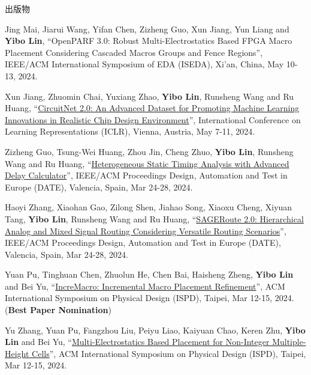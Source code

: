 \begin{rSection}{出版物}
\begin{description}[font=\normalfont, rightmargin=2em]
{}
            

\item[{[C94]}]{
        Jing Mai, Jiarui Wang, Yifan Chen, Zizheng Guo, Xun Jiang, Yun Liang and \textbf{Yibo Lin}, 
    ``OpenPARF 3.0: Robust Multi-Electrostatics Based FPGA Macro Placement Considering Cascaded Macros Groups and Fence Regions'', 
    IEEE/ACM International Symposium of EDA (ISEDA), Xi'an, China, May 10-13, 2024.
    
}
            

\item[{[C93]}]{
        Xun Jiang, Zhuomin Chai, Yuxiang Zhao, \textbf{Yibo Lin}, Runsheng Wang and Ru Huang, 
    ``\href{https://openreview.net/pdf?id=nMFSUjxMIl}{CircuitNet 2.0: An Advanced Dataset for Promoting Machine Learning Innovations in Realistic Chip Design Environment}'', 
    International Conference on Learning Representations (ICLR), Vienna, Austria, May 7-11, 2024.
    
}
            

\item[{[C92]}]{
        Zizheng Guo, Tsung-Wei Huang, Zhou Jin, Cheng Zhuo, \textbf{Yibo Lin}, Runsheng Wang and Ru Huang, 
    ``\href{https://ieeexplore.ieee.org/document/10546507}{Heterogeneous Static Timing Analysis with Advanced Delay Calculator}'', 
    IEEE/ACM Proceedings Design, Automation and Test in Europe (DATE), Valencia, Spain, Mar 24-28, 2024.
    
}
            

\item[{[C91]}]{
        Haoyi Zhang, Xiaohan Gao, Zilong Shen, Jiahao Song, Xiaoxu Cheng, Xiyuan Tang, \textbf{Yibo Lin}, Runsheng Wang and Ru Huang, 
    ``\href{https://ieeexplore.ieee.org/document/10546542}{SAGERoute 2.0: Hierarchical Analog and Mixed Signal Routing Considering Versatile Routing Scenarios}'', 
    IEEE/ACM Proceedings Design, Automation and Test in Europe (DATE), Valencia, Spain, Mar 24-28, 2024.
    
}
            

\item[{[C90]}]{
        Yuan Pu, Tinghuan Chen, Zhuolun He, Chen Bai, Haisheng Zheng, \textbf{Yibo Lin} and Bei Yu, 
    ``\href{https://doi.org/10.1145/3626184.3633321}{IncreMacro: Incremental Macro Placement Refinement}'', 
    ACM International Symposium on Physical Design (ISPD), Taipei, Mar 12-15, 2024.
    (\textbf{Best Paper Nomination})
}
            

\item[{[C89]}]{
        Yu Zhang, Yuan Pu, Fangzhou Liu, Peiyu Liao, Kaiyuan Chao, Keren Zhu, \textbf{Yibo Lin} and Bei Yu, 
    ``\href{https://doi.org/10.1145/3626184.3633320}{Multi-Electrostatics Based Placement for Non-Integer Multiple-Height Cells}'', 
    ACM International Symposium on Physical Design (ISPD), Taipei, Mar 12-15, 2024.
    
}
\end{description}
\end{rSection}
